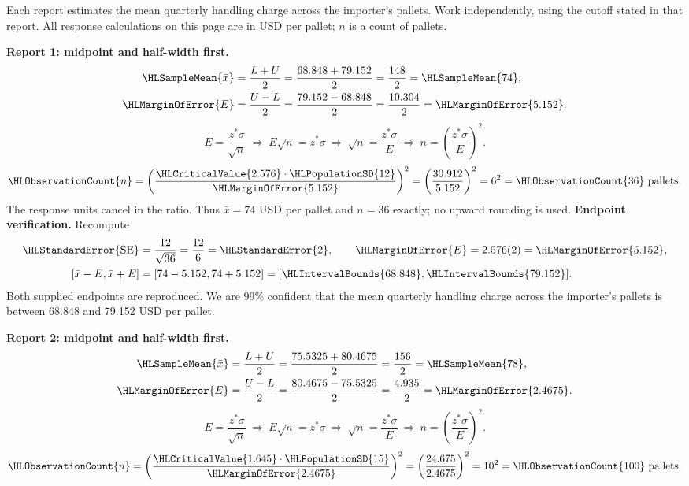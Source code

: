 Each report estimates the mean quarterly handling charge across the importer's pallets. Work independently, using the cutoff stated in that report. All response calculations on this page are in USD per pallet; $n$ is a count of pallets.
\par\noindent\textbf{Report 1: midpoint and half-width first.}
\[\begin{aligned}
\HLSampleMean{\bar x}&=\frac{L+U}{2}=\frac{68.848+79.152}{2}=\frac{148}{2}=\HLSampleMean{74},\\
\HLMarginOfError{E}&=\frac{U-L}{2}=\frac{79.152-68.848}{2}=\frac{10.304}{2}=\HLMarginOfError{5.152}.
\end{aligned}\]
\[E=\frac{z^*\sigma}{\sqrt n}\ \Longrightarrow\ E\sqrt n=z^*\sigma\ \Longrightarrow\ \sqrt n=\frac{z^*\sigma}{E}\ \Longrightarrow\ n=\left(\frac{z^*\sigma}{E}\right)^2.\]
\[\HLObservationCount{n}=\left(\frac{\HLCriticalValue{2.576}\cdot\HLPopulationSD{12}}{\HLMarginOfError{5.152}}\right)^2=\left(\frac{30.912}{5.152}\right)^2=6^2=\HLObservationCount{36}\text{ pallets}.\]
The response units cancel in the ratio. Thus $\bar x=74$ USD per pallet and $n=36$ exactly; no upward rounding is used.
\textbf{Endpoint verification.} Recompute
\[\begin{aligned}
\HLStandardError{\mathrm{SE}}&=\frac{12}{\sqrt{36}}=\frac{12}{6}=\HLStandardError{2},\qquad \HLMarginOfError{E}=2.576(2)=\HLMarginOfError{5.152},\\
[\bar x-E,\bar x+E]&=[74-5.152,74+5.152]=[\HLIntervalBounds{68.848},\HLIntervalBounds{79.152}].
\end{aligned}\]
Both supplied endpoints are reproduced. We are 99\% confident that the mean quarterly handling charge across the importer's pallets is between 68.848 and 79.152 USD per pallet.
\clearpage
\par\noindent\textbf{Report 2: midpoint and half-width first.}
\[\begin{aligned}
\HLSampleMean{\bar x}&=\frac{L+U}{2}=\frac{75.5325+80.4675}{2}=\frac{156}{2}=\HLSampleMean{78},\\
\HLMarginOfError{E}&=\frac{U-L}{2}=\frac{80.4675-75.5325}{2}=\frac{4.935}{2}=\HLMarginOfError{2.4675}.
\end{aligned}\]
\[E=\frac{z^*\sigma}{\sqrt n}\ \Longrightarrow\ E\sqrt n=z^*\sigma\ \Longrightarrow\ \sqrt n=\frac{z^*\sigma}{E}\ \Longrightarrow\ n=\left(\frac{z^*\sigma}{E}\right)^2.\]
\[\HLObservationCount{n}=\left(\frac{\HLCriticalValue{1.645}\cdot\HLPopulationSD{15}}{\HLMarginOfError{2.4675}}\right)^2=\left(\frac{24.675}{2.4675}\right)^2=10^2=\HLObservationCount{100}\text{ pallets}.\]
